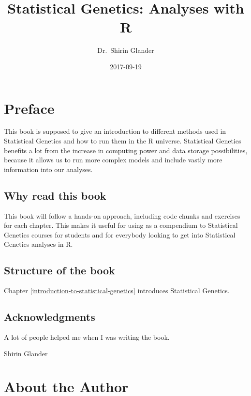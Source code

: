 \documentclass[12pt,]{krantz}
\title{Statistical Genetics: Analyses with R}
\author{Dr.~Shirin Glander}
\date{2017-09-19}
\theoremstyle{definition}
\theoremstyle{definition}
\theoremstyle{definition}
\theoremstyle{remark}
\let\BeginKnitrBlock\begin \let\EndKnitrBlock\end
\begin{document}
\maketitle

\pagestyle{empty}\cleardoublepage\newpage

\frontmatter

{
\hypersetup{linkcolor=black}
\setcounter{tocdepth}{1}
\tableofcontents
}
\listoftables
\listoffigures
\chapter*{Preface}\label{preface}


This book is supposed to give an introduction to different methods used
in Statistical Genetics and how to run them in the R universe.
Statistical Genetics benefits a lot from the increase in computing power
and data storage possibilities, because it allows us to run more complex
models and include vastly more information into our analyses.

\section*{Why read this book}\label{why-read-this-book}


This book will follow a hands-on approach, including code chunks and
exercises for each chapter. This makes it useful for using as a
compendium to Statistical Genetics courses for students and for
everybody looking to get into Statistical Genetics analyses in R.

\section*{Structure of the book}\label{structure-of-the-book}


Chapter \ref{introduction-to-statistical-genetics} introduces
Statistical Genetics.

\section*{Acknowledgments}\label{acknowledgments}


A lot of people helped me when I was writing the book.

\BeginKnitrBlock{flushright}
Shirin Glander
\EndKnitrBlock{flushright}

\chapter*{About the Author}\label{about-the-author}
\end{document}
